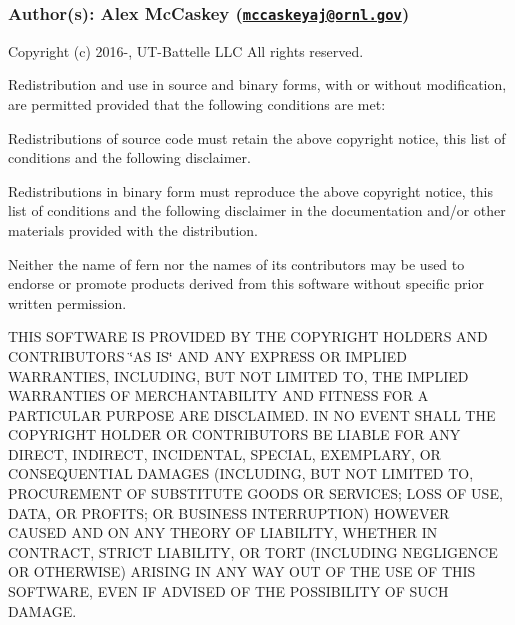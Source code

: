 \subsubsection*{Author(s)\+: Alex Mc\+Caskey (\href{mailto:mccaskeyaj@ornl.gov}{\tt mccaskeyaj@ornl.\+gov}) }



 Copyright (c) 2016-\/, U\+T-\/\+Battelle L\+L\+C All rights reserved.

Redistribution and use in source and binary forms, with or without modification, are permitted provided that the following conditions are met\+:

Redistributions of source code must retain the above copyright notice, this list of conditions and the following disclaimer.

Redistributions in binary form must reproduce the above copyright notice, this list of conditions and the following disclaimer in the documentation and/or other materials provided with the distribution.

Neither the name of fern nor the names of its contributors may be used to endorse or promote products derived from this software without specific prior written permission.

T\+H\+I\+S S\+O\+F\+T\+W\+A\+R\+E I\+S P\+R\+O\+V\+I\+D\+E\+D B\+Y T\+H\+E C\+O\+P\+Y\+R\+I\+G\+H\+T H\+O\+L\+D\+E\+R\+S A\+N\+D C\+O\+N\+T\+R\+I\+B\+U\+T\+O\+R\+S \char`\"{}\+A\+S I\+S\char`\"{} A\+N\+D A\+N\+Y E\+X\+P\+R\+E\+S\+S O\+R I\+M\+P\+L\+I\+E\+D W\+A\+R\+R\+A\+N\+T\+I\+E\+S, I\+N\+C\+L\+U\+D\+I\+N\+G, B\+U\+T N\+O\+T L\+I\+M\+I\+T\+E\+D T\+O, T\+H\+E I\+M\+P\+L\+I\+E\+D W\+A\+R\+R\+A\+N\+T\+I\+E\+S O\+F M\+E\+R\+C\+H\+A\+N\+T\+A\+B\+I\+L\+I\+T\+Y A\+N\+D F\+I\+T\+N\+E\+S\+S F\+O\+R A P\+A\+R\+T\+I\+C\+U\+L\+A\+R P\+U\+R\+P\+O\+S\+E A\+R\+E D\+I\+S\+C\+L\+A\+I\+M\+E\+D. I\+N N\+O E\+V\+E\+N\+T S\+H\+A\+L\+L T\+H\+E C\+O\+P\+Y\+R\+I\+G\+H\+T H\+O\+L\+D\+E\+R O\+R C\+O\+N\+T\+R\+I\+B\+U\+T\+O\+R\+S B\+E L\+I\+A\+B\+L\+E F\+O\+R A\+N\+Y D\+I\+R\+E\+C\+T, I\+N\+D\+I\+R\+E\+C\+T, I\+N\+C\+I\+D\+E\+N\+T\+A\+L, S\+P\+E\+C\+I\+A\+L, E\+X\+E\+M\+P\+L\+A\+R\+Y, O\+R C\+O\+N\+S\+E\+Q\+U\+E\+N\+T\+I\+A\+L D\+A\+M\+A\+G\+E\+S (I\+N\+C\+L\+U\+D\+I\+N\+G, B\+U\+T N\+O\+T L\+I\+M\+I\+T\+E\+D T\+O, P\+R\+O\+C\+U\+R\+E\+M\+E\+N\+T O\+F S\+U\+B\+S\+T\+I\+T\+U\+T\+E G\+O\+O\+D\+S O\+R S\+E\+R\+V\+I\+C\+E\+S; L\+O\+S\+S O\+F U\+S\+E, D\+A\+T\+A, O\+R P\+R\+O\+F\+I\+T\+S; O\+R B\+U\+S\+I\+N\+E\+S\+S I\+N\+T\+E\+R\+R\+U\+P\+T\+I\+O\+N) H\+O\+W\+E\+V\+E\+R C\+A\+U\+S\+E\+D A\+N\+D O\+N A\+N\+Y T\+H\+E\+O\+R\+Y O\+F L\+I\+A\+B\+I\+L\+I\+T\+Y, W\+H\+E\+T\+H\+E\+R I\+N C\+O\+N\+T\+R\+A\+C\+T, S\+T\+R\+I\+C\+T L\+I\+A\+B\+I\+L\+I\+T\+Y, O\+R T\+O\+R\+T (I\+N\+C\+L\+U\+D\+I\+N\+G N\+E\+G\+L\+I\+G\+E\+N\+C\+E O\+R O\+T\+H\+E\+R\+W\+I\+S\+E) A\+R\+I\+S\+I\+N\+G I\+N A\+N\+Y W\+A\+Y O\+U\+T O\+F T\+H\+E U\+S\+E O\+F T\+H\+I\+S S\+O\+F\+T\+W\+A\+R\+E, E\+V\+E\+N I\+F A\+D\+V\+I\+S\+E\+D O\+F T\+H\+E P\+O\+S\+S\+I\+B\+I\+L\+I\+T\+Y O\+F S\+U\+C\+H D\+A\+M\+A\+G\+E.

